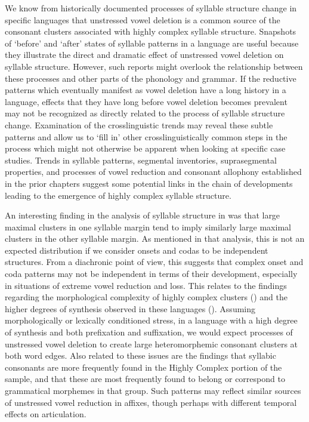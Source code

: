   We know from historically documented processes of syllable structure change in specific languages that unstressed vowel deletion is a common source of the consonant clusters associated with highly complex syllable structure. Snapshots of ‘before’ and ‘after’ states of syllable patterns in a language are useful because they illustrate the direct and dramatic effect of unstressed vowel deletion on syllable structure. However, such reports might overlook the relationship between these processes and other parts of the phonology and grammar. If the reductive patterns which eventually manifest as vowel deletion have a long history in a language, effects that they have long before vowel deletion becomes prevalent may not be recognized as directly related to the process of syllable structure change. Examination of the crosslinguistic trends may reveal these subtle patterns and allow us to ‘fill in’ other crosslinguistically common steps in the process which might not otherwise be apparent when looking at specific case studies. Trends in syllable patterns, segmental inventories, suprasegmental properties, and processes of vowel reduction and consonant allophony established in the prior chapters suggest some potential links in the chain of developments leading to the emergence of highly complex syllable structure.



  An interesting finding in the analysis of syllable structure in  was that large maximal clusters in one syllable margin tend to imply similarly large maximal clusters in the other syllable margin. As mentioned in that analysis, this is not an expected distribution if we consider onsets and codas to be independent structures. From a diachronic point of view, this suggests that complex onset and coda patterns may not be independent in terms of their development, especially in situations of extreme vowel reduction and loss. This relates to the findings regarding the morphological complexity of highly complex clusters () and the higher degrees of synthesis observed in these languages (). Assuming morphologically or lexically conditioned stress, in a language with a high degree of synthesis and both prefixation and suffixation, we would expect processes of unstressed vowel deletion to create large heteromorphemic consonant clusters at both word edges. Also related to these issues are the findings that syllabic consonants are more frequently found in the Highly Complex portion of the sample, and that these are most frequently found to belong or correspond to grammatical morphemes in that group. Such patterns may reflect similar sources of unstressed vowel reduction in affixes, though perhaps with different temporal effects on articulation.



